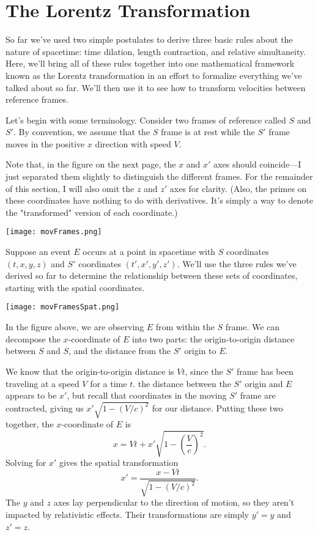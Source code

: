 \documentclass[../p023main.tex]{subfiles}
\begin{document}
\section{The Lorentz Transformation}
So far we've used two simple postulates to derive three basic rules about the nature of spacetime: time dilation, length contraction, and relative simultaneity.
Here, we'll bring all of these rules together into one mathematical framework known as the Lorentz transformation in an effort to formalize everything we've talked about so far.
We'll then use it to see how to transform velocities between reference frames.

Let's begin with some terminology.
Consider two frames of reference called $S$ and $S'$.
By convention, we assume that the $S$ frame is at rest while the $S'$ frame moves in the positive $x$ direction with speed $V$.

Note that, in the figure on the next page, the $x$ and $x'$ axes should coincide---I just separated them slightly to distinguish the different frames.
For the remainder of this section, I will also omit the $z$ and $z'$ axes for clarity.
(Also, the primes on these coordinates have nothing to do with derivatives.
It's simply a way to denote the "transformed" version of each coordinate.)
\begin{center}
    \texttt{[image: movFrames.png]}
\end{center}
Suppose an event $E$ occurs at a point in spacetime with $S$ coordinates $(t, x, y, z)$ and $S'$ coordinates $(t', x', y', z')$.
We'll use the three rules we've derived so far to determine the relationship between these sets of coordinates, starting with the spatial coordinates.
\begin{center}
    \texttt{[image: movFramesSpat.png]}
\end{center}
In the figure above, we are observing $E$ from within the $S$ frame.
We can decompose the $x$-coordinate of $E$ into two parts: the origin-to-origin distance between $S$ and $S$, and the distance from the $S'$ origin to $E$.

We know that the origin-to-origin distance is $Vt$, since the $S'$ frame has been traveling at a speed $V$ for a time $t$.
the distance between the $S'$ origin and $E$ appears to be $x'$, but recall that coordinates in the moving $S'$ frame are contracted, giving us $x' \sqrt{1 - \left( V / c \right)^2}$ for our distance.
Putting these two together, the $x$-coordinate of $E$ is
\[ x = Vt + x'\sqrt{1 - \left( \frac{V}{c} \right)^2}. \]
Solving for $x'$ gives the spatial transformation
\[ x' = \frac{x - Vt}{\sqrt{1 - \left( V / c \right)^2}}. \]
The $y$ and $z$ axes lay perpendicular to the direction of motion, so they aren't impacted by relativistic effects.
Their transformations are simply $y' = y$ and $z' = z$.
\end{document}
